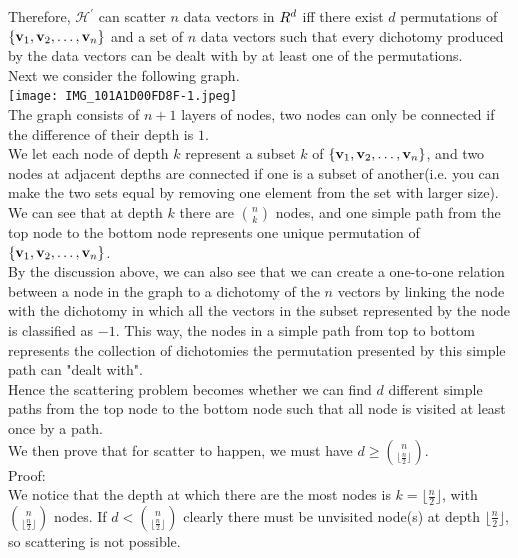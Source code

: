 \documentclass[11pt]{article}
\let\mathbb\relax
\theoremstyle{definition}
\newtheorem{lma}{Lemma}
\begin{document}
Therefore, $\mathcal{H}^\prime$ can scatter $n$ data vectors in $\mathbb{R}^d$ iff there exist $d$ permutations of $\{\vb{v}_1, \vb{v}_2,\dots,\vb{v}_n\}$ and a set of $n$ data vectors such that every dichotomy produced by the data vectors can be dealt with by at least one of the permutations. \\
\bigbreak
Next we consider the following graph.\\
\texttt{[image: IMG\_101A1D00FD8F-1.jpeg]}\\
The graph consists of $n + 1$ layers of nodes, two nodes can only be connected if the difference of their depth is $1$. \\ 
We let each node of depth $k$ represent a subset $k$ of $\{\vb{v}_1, \vb{v}_2,\dots,\vb{v}_n\}$, and two nodes at adjacent depths are connected if one is a subset of another(i.e. you can make the two sets equal by removing one element from the set with larger size). \\ 
 We can see that at depth $k$ there are ${n\choose k}$ nodes, and one simple path from the top node to the bottom node represents one unique permutation of $\{\vb{v}_1, \vb{v}_2,\dots,\vb{v}_n\}$. \\ 
 By the discussion above, we can also see that we can create a one-to-one relation between a node in the graph to a dichotomy of the $n$ vectors by linking the node with the dichotomy in which all the vectors in the subset represented by the node is classified as $-1$. This way, the nodes in a simple path from top to bottom represents the collection of dichotomies the permutation presented by this simple path can "dealt with". \\
 Hence the scattering problem becomes whether we can find $d$ different simple paths from the top node to the bottom node such that all node is visited at least once by a path. \\
 \medbreak
 We then prove that for scatter to happen, we must have $d \geq {n\choose \lfloor\frac{n}{2}\rfloor}$. \\
 Proof: \\
 We notice that the depth at which there are the most nodes is $k = \lfloor\frac{n}{2}\rfloor$, with ${n\choose \lfloor\frac{n}{2}\rfloor}$ nodes. If $d < {n\choose \lfloor\frac{n}{2}\rfloor}$ clearly there must be unvisited node(s) at depth $\lfloor\frac{n}{2}\rfloor$, so scattering is not possible. \\ 
\end{document}
